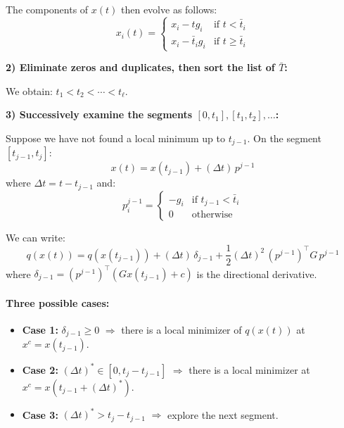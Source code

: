 The components of $x(t)$ then evolve as follows:
\begin{equation}
    x_i(t) = \begin{cases}
        x_i - t g_i & \text{if } t < \bar{t}_i \\
        x_i - \bar{t}_i g_i & \text{if } t \ge \bar{t}_i
    \end{cases}
\end{equation}

\textbf{2) Eliminate zeros and duplicates, then sort the list of $\bar{T}$:}

We obtain: $t_1 < t_2 < \cdots < t_\ell$.

\textbf{3) Successively examine the segments $[0, t_1], [t_1, t_2], \ldots$:}

Suppose we have not found a local minimum up to $t_{j-1}$. On the segment $[t_{j-1}, t_j]$:
\begin{equation}
    x(t) = x(t_{j-1}) + (\Delta t) \, p^{j-1}
\end{equation}
where $\Delta t = t - t_{j-1}$ and:
\begin{equation}
    p_i^{j-1} = \begin{cases}
        -g_i & \text{if } t_{j-1} < \bar{t}_i \\
        0 & \text{otherwise}
    \end{cases}
\end{equation}

We can write:
\begin{equation}
    q(x(t)) = q(x(t_{j-1})) + (\Delta t) \, \delta_{j-1} + \frac{1}{2} (\Delta t)^2 \, (p^{j-1})^\top G \, p^{j-1}
\end{equation}
where $\delta_{j-1} = (p^{j-1})^\top (G x(t_{j-1}) + c)$ is the directional derivative.

\paragraph{Three possible cases:}
\begin{itemize}
    \item \textbf{Case 1:} $\delta_{j-1} \ge 0$ $\Rightarrow$ there is a local minimizer of $q(x(t))$ at $x^c = x(t_{j-1})$.
    \item \textbf{Case 2:} $(\Delta t)^* \in [0, t_j - t_{j-1}]$ $\Rightarrow$ there is a local minimizer at $x^c = x(t_{j-1} + (\Delta t)^*)$.
    \item \textbf{Case 3:} $(\Delta t)^* > t_j - t_{j-1}$ $\Rightarrow$ explore the next segment.
\end{itemize}

